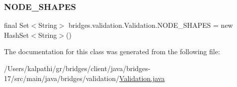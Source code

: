 \mbox{\label{classbridges_1_1validation_1_1_validation_a43f1f9efc20d0086b7fcfa9b40bd7146}} 
\subsubsection{\texorpdfstring{N\+O\+D\+E\+\_\+\+S\+H\+A\+P\+ES}{NODE\_SHAPES}}
{\footnotesize\ttfamily final Set$<$String$>$ bridges.\+validation.\+Validation.\+N\+O\+D\+E\+\_\+\+S\+H\+A\+P\+ES = new Hash\+Set$<$String$>$()\hspace{0.3cm}{\ttfamily [static]}}



The documentation for this class was generated from the following file\+:\begin{DoxyCompactItemize}
\item 
/\+Users/kalpathi/gr/bridges/client/java/bridges-\/17/src/main/java/bridges/validation/\mbox{\hyperlink{_validation_8java}{Validation.\+java}}\end{DoxyCompactItemize}
